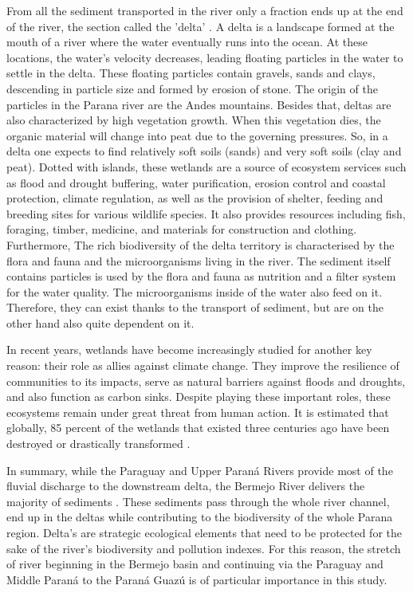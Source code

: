 From all the sediment transported in the river only a fraction ends up at the end of the river, the section called the 'delta' \autocite{academialabParanaDelta}. A delta is a landscape formed at the mouth of a river where the water eventually runs into the ocean. At these locations, the water's velocity decreases, leading floating particles in the water to settle in the delta. These floating particles contain gravels, sands and clays, descending in particle size and formed by erosion of stone. The origin of the particles in the Parana river are the Andes mountains. Besides that, deltas are also characterized by high vegetation growth. When this vegetation dies, the organic material will change into peat due to the governing pressures. So, in a delta one expects to find relatively soft soils (sands) and very soft soils (clay and peat). Dotted with islands, these wetlands are a source of ecosystem services such as flood and drought buffering, water purification, erosion control and coastal protection, climate regulation, as well as the provision of shelter, feeding and breeding sites for various wildlife species. It also provides resources including fish, foraging, timber, medicine, and materials for construction and clothing. Furthermore, The rich biodiversity of the delta territory is characterised by the flora and fauna and the microorganisms living in the river. The sediment itself contains particles is used by the flora and fauna as nutrition and a filter system for the water quality. The microorganisms inside of the water also feed on it. 
Therefore, they can exist thanks to the transport of sediment, but are on the other hand also quite dependent on it\autocite{hibaParanaRiverEcological2024}.

In recent years, wetlands have become increasingly studied for another key reason: their role as allies against climate change. They improve the resilience of communities to its impacts, serve as natural barriers against floods and droughts, and also function as carbon sinks. Despite playing these important roles, these ecosystems remain under great threat from human action. It is estimated that globally, 85 percent of the wetlands that existed three centuries ago have been destroyed or drastically transformed \autocite{hibaParanaRiverEcological2024}.

In summary, while the Paraguay and Upper Paraná Rivers provide most of the fluvial discharge to the downstream delta, the Bermejo River delivers the majority of sediments \autocite{lopezweibelSourcesTemporalDynamics2022}. These sediments pass through the whole river channel, end up in the deltas while contributing to the biodiversity of the whole Parana region. Delta's are strategic ecological elements that need to be protected for the sake of the river's biodiversity and pollution indexes. For this reason, the stretch of river beginning in the Bermejo basin and continuing via the Paraguay and Middle Paraná to the Paraná Guazú is of particular importance in this study. 


